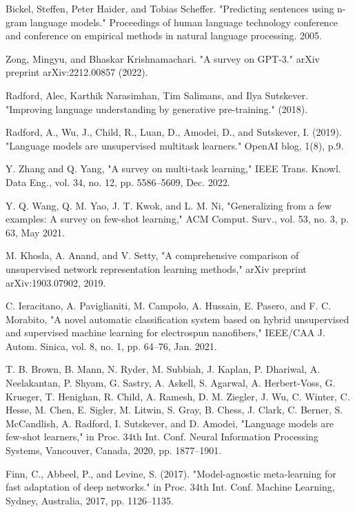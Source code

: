 \documentclass[conference]{IEEEtran}
\begin{document}
\begin{thebibliography}{00}
 Bickel, Steffen, Peter Haider, and Tobias Scheffer. "Predicting sentences using n-gram language models." Proceedings of human language technology conference and conference on empirical methods in natural language processing. 2005.

 Zong, Mingyu, and Bhaskar Krishnamachari. "A survey on GPT-3." arXiv preprint arXiv:2212.00857 (2022).

 Radford, Alec, Karthik Narasimhan, Tim Salimans, and Ilya Sutskever. "Improving language understanding by generative pre-training." (2018).

 Radford, A., Wu, J., Child, R., Luan, D., Amodei, D., and Sutskever, I. (2019). "Language models are unsupervised multitask learners." OpenAI blog, 1(8), p.9.

 Y. Zhang and Q. Yang, "A survey on multi-task learning," IEEE Trans. Knowl. Data Eng., vol. 34, no. 12, pp. 5586–5609, Dec. 2022.

 Y. Q. Wang, Q. M. Yao, J. T. Kwok, and L. M. Ni, "Generalizing from a few examples: A survey on few-shot learning," ACM Comput. Surv., vol. 53, no. 3, p. 63, May 2021.

 M. Khosla, A. Anand, and V. Setty, "A comprehensive comparison of unsupervised network representation learning methods," arXiv preprint arXiv:1903.07902, 2019.

 C. Ieracitano, A. Paviglianiti, M. Campolo, A. Hussain, E. Pasero, and F. C. Morabito, "A novel automatic classification system based on hybrid unsupervised and supervised machine learning for electrospun nanofibers," IEEE/CAA J. Autom. Sinica, vol. 8, no. 1, pp. 64–76, Jan. 2021.

 T. B. Brown, B. Mann, N. Ryder, M. Subbiah, J. Kaplan, P. Dhariwal, A. Neelakantan, P. Shyam, G. Sastry, A. Askell, S. Agarwal, A. Herbert-Voss, G. Krueger, T. Henighan, R. Child, A. Ramesh, D. M. Ziegler, J. Wu, C. Winter, C. Hesse, M. Chen, E. Sigler, M. Litwin, S. Gray, B. Chess, J. Clark, C. Berner, S. McCandlish, A. Radford, I. Sutskever, and D. Amodei, "Language models are few-shot learners," in Proc. 34th Int. Conf. Neural Information Processing Systems, Vancouver, Canada, 2020, pp. 1877–1901.

 Finn, C., Abbeel, P., and Levine, S. (2017). "Model-agnostic meta-learning for fast adaptation of deep networks." in Proc. 34th Int. Conf. Machine Learning, Sydney, Australia, 2017, pp. 1126–1135.


\end{thebibliography}
\end{document}
